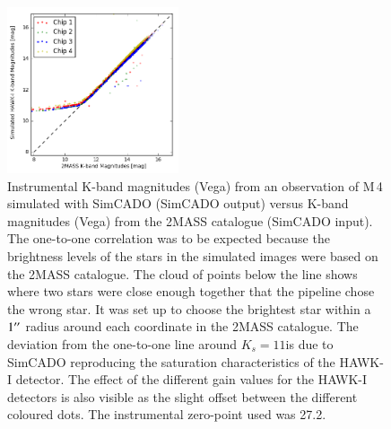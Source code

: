 \begin{figure}

    \centering
    \includegraphics[width=0.45\textwidth]{images/2MASS_vs_HAWKado_inst_mags_single}
    
    \caption{Instrumental K-band magnitudes (Vega) from an observation of M\,4 simulated with SimCADO (SimCADO output) versus K-band magnitudes (Vega) from the 2MASS catalogue (SimCADO input). The one-to-one correlation was to be expected because the brightness levels of the stars in the simulated images were based on the 2MASS catalogue. The cloud of points below the line shows where two stars were close enough together that the pipeline chose the wrong star. It was set up to choose the brightest star within a $1^{\prime\prime}$ radius around each coordinate in the 2MASS catalogue. The deviation from the one-to-one line around $K_{s}=11$\m is due to SimCADO reproducing the saturation characteristics of the HAWK-I detector. The effect of the different gain values for the HAWK-I detectors is also visible as the slight offset between the different coloured dots. The instrumental zero-point used was 27.2\m.}
    \label{fig:2mass_hawkado_flux_comparison}

\end{figure}

